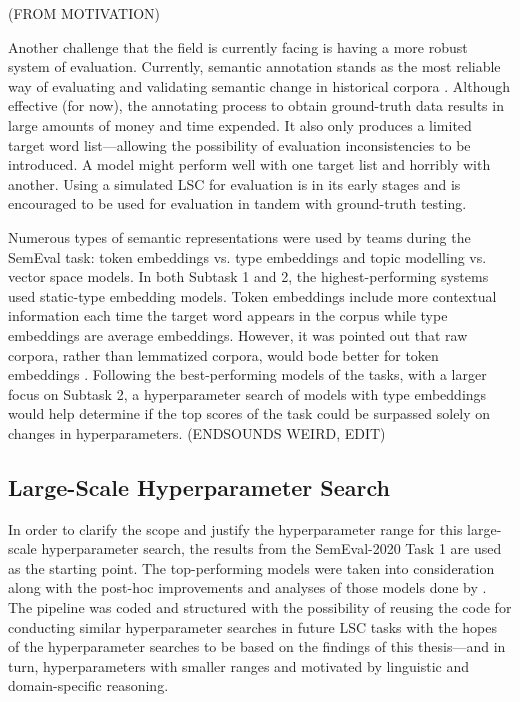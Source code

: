 (FROM MOTIVATION)

Another challenge that the field is currently facing is having a more robust system of evaluation. Currently, semantic annotation stands as the most reliable way of evaluating and validating semantic change in historical corpora \citep{hengchen2021challenges}. Although effective (for now), the annotating process to obtain ground-truth data results in large amounts of money and time expended. It also only produces a limited target word list—allowing the possibility of evaluation inconsistencies to be introduced. A model might perform well with one target list and horribly with another. Using a simulated LSC for evaluation is in its early stages and is encouraged to be used for evaluation in tandem with ground-truth testing.

Numerous types of semantic representations were used by teams during the SemEval task: token embeddings vs. type embeddings and topic modelling vs. vector space models. In both Subtask 1 and 2, the highest-performing systems used static-type embedding models. Token embeddings include more contextual information each time the target word appears in the corpus while type embeddings are average embeddings. However, it was pointed out that raw corpora, rather than lemmatized corpora, would bode better for token embeddings \citep{schlechtweg-etal-2020-semeval}. Following the best-performing models of the tasks, with a larger focus on Subtask 2, a hyperparameter search of models with type embeddings would help determine if the top scores of the task could be surpassed solely on changes in hyperparameters. (ENDSOUNDS WEIRD, EDIT) 

\subsection{Large-Scale Hyperparameter Search}

In order to clarify the scope and justify the hyperparameter range for this large-scale hyperparameter search, the results from the SemEval-2020 Task 1 are used as the starting point. The top-performing models were taken into consideration along with the post-hoc improvements and analyses of those models done by \citet{kaiser-etal-2020-ims}. The pipeline was coded and structured with the possibility of reusing the code for conducting similar hyperparameter searches in future LSC tasks with the hopes of the hyperparameter searches to be based on the findings of this thesis—and in turn, hyperparameters with smaller ranges and motivated by linguistic and domain-specific reasoning. 

